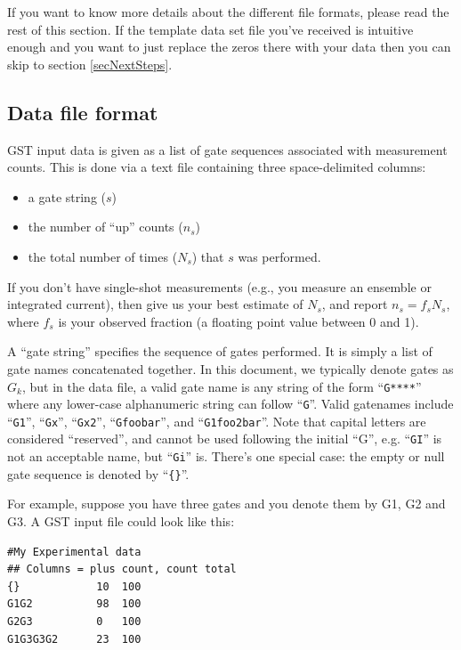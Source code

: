 \documentclass{article}[11pt]
\begin{document}
\noindent If you want to know more details about the different file formats, please read the rest of this section.  If the template data set file you've received is intuitive enough and you want to just replace the zeros there with your data then you can skip to section \ref{secNextSteps}.

\subsection{Data file format}
GST input data is given as a list of gate sequences associated with measurement counts.  This is done via a text file containing three space-delimited columns:
\begin{itemize}
\item a gate string ($s$)
\item the number of ``up'' counts ($n_s$) %
\item the total number of times ($N_s$) that $s$ was performed.
\end{itemize}
If you don't have single-shot measurements (e.g., you measure an ensemble or integrated current), then give us your best estimate of $N_s$, and report $n_s = f_sN_s$, where $f_s$ is your observed fraction (a floating point value between 0 and 1).

A ``gate string'' specifies the sequence of gates performed.  It is simply a list of gate names concatenated together.  In this document, we typically denote gates as $G_k$, but in the data file, a valid gate name is any string of the form ``\texttt{G****}'' where any lower-case alphanumeric string can follow ``\texttt{G}''.  Valid gatenames include ``\texttt{G1}'', ``\texttt{Gx}'', ``\texttt{Gx2}'', ``\texttt{Gfoobar}'', and ``\texttt{G1foo2bar}''.  Note that capital letters are considered ``reserved'', and cannot be used following the initial ``G'', e.g. ``\texttt{GI}'' is not an acceptable name, but ``\texttt{Gi}'' is.  There's one special case:  the empty or null gate sequence is denoted by ``\texttt{\{\}}''.

For example, suppose you have three gates and you denote them by G1, G2 and G3.  A GST input file could look like this:

\begin{minipage}{\linewidth}
\begin{lstlisting}[frame=single,caption=Example data file]
#My Experimental data
## Columns = plus count, count total
{}            10  100
G1G2          98  100
G2G3          0   100
G1G3G3G2      23  100
\end{lstlisting}
\end{minipage}
\end{document}
